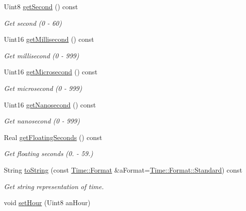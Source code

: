 \begin{DoxyCompactItemize}
Uint8 \hyperlink{classostk_1_1physics_1_1time_1_1_time_afe4041426b008059853110b13e2802de}{get\+Second} () const
\begin{DoxyCompactList}\small\item\em Get second (0 -\/ 60) \end{DoxyCompactList}\item 
Uint16 \hyperlink{classostk_1_1physics_1_1time_1_1_time_a73308a0a9dcf7105130d1b40d2ef7d93}{get\+Millisecond} () const
\begin{DoxyCompactList}\small\item\em Get millisecond (0 -\/ 999) \end{DoxyCompactList}\item 
Uint16 \hyperlink{classostk_1_1physics_1_1time_1_1_time_acb4915ca99f2065f6d777d96833337db}{get\+Microsecond} () const
\begin{DoxyCompactList}\small\item\em Get microsecond (0 -\/ 999) \end{DoxyCompactList}\item 
Uint16 \hyperlink{classostk_1_1physics_1_1time_1_1_time_aebe3fc329d7b7b07c1f0ac04600ebc03}{get\+Nanosecond} () const
\begin{DoxyCompactList}\small\item\em Get nanosecond (0 -\/ 999) \end{DoxyCompactList}\item 
Real \hyperlink{classostk_1_1physics_1_1time_1_1_time_ad0c70220f4ba971306781eb92d8f2030}{get\+Floating\+Seconds} () const
\begin{DoxyCompactList}\small\item\em Get floating seconds (0. -\/ 59.) \end{DoxyCompactList}\item 
String \hyperlink{classostk_1_1physics_1_1time_1_1_time_a33adb26e33abdfa65581626372f430bd}{to\+String} (const \hyperlink{classostk_1_1physics_1_1time_1_1_time_a207e776746c45c3aaffcf7112b2bc951}{Time\+::\+Format} \&a\+Format=\hyperlink{classostk_1_1physics_1_1time_1_1_time_a207e776746c45c3aaffcf7112b2bc951aeb6d8ae6f20283755b339c0dc273988b}{Time\+::\+Format\+::\+Standard}) const
\begin{DoxyCompactList}\small\item\em Get string representation of time. \end{DoxyCompactList}\item 
void \hyperlink{classostk_1_1physics_1_1time_1_1_time_a27d456d374f5799050f3ea8aed8478ac}{set\+Hour} (Uint8 an\+Hour)

\end{DoxyCompactItemize}
